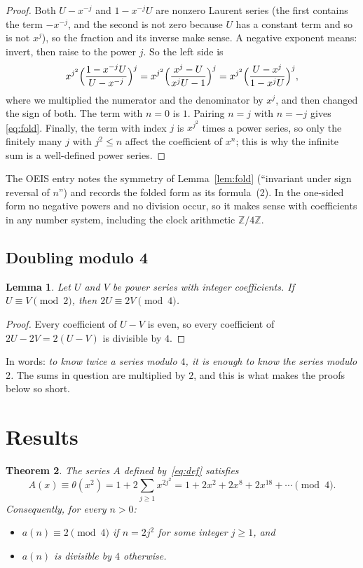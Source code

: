 \documentclass[11pt,a4paper]{article}
\newtheorem{theorem}{Theorem}[section]
\newtheorem{lemma}[theorem]{Lemma}
\theoremstyle{definition}
\theoremstyle{remark}
\newcommand{\Z}{\mathbb{Z}}
\begin{document}
\begin{proof}
Both $U-x^{-j}$ and $1-x^{-j}U$ are nonzero Laurent series (the first contains the term $-x^{-j}$, and the second is
not zero because $U$ has a constant term and so is not $x^j$), so the fraction and its inverse make sense. A negative
exponent means: invert, then raise to the power $j$. So the left side is
\[
x^{j^2}\Bigl(\frac{1-x^{-j}U}{U-x^{-j}}\Bigr)^{j}
=x^{j^2}\Bigl(\frac{x^j-U}{x^jU-1}\Bigr)^{j}
=x^{j^2}\Bigl(\frac{U-x^j}{1-x^jU}\Bigr)^{j},
\]
where we multiplied the numerator and the denominator by $x^j$, and then changed the sign of both. The term with
$n=0$ is $1$. Pairing $n=j$ with $n=-j$ gives \eqref{eq:fold}. Finally, the term with index $j$ is $x^{j^2}$ times a
power series, so only the finitely many $j$ with $j^2\le n$ affect the coefficient of $x^n$; this is why the infinite
sum is a well-defined power series.
\end{proof}

The OEIS entry notes the symmetry of Lemma~\ref{lem:fold} (``invariant under sign reversal of $n$'') and records the
folded form as its formula~(2). In the one-sided form no negative powers and no division occur, so it makes sense
with coefficients in any number system, including the clock arithmetic $\Z/4\Z$.

\subsection{Doubling modulo 4}
\begin{lemma}\label{lem:double}
Let $U$ and $V$ be power series with integer coefficients. If $U\equiv V\pmod 2$, then $2U\equiv2V\pmod 4$.
\end{lemma}

\begin{proof}
Every coefficient of $U-V$ is even, so every coefficient of $2U-2V=2(U-V)$ is divisible by $4$.
\end{proof}
In words: \emph{to know twice a series modulo $4$, it is enough to know the series modulo $2$.} The sums in
question are multiplied by $2$, and this is what makes the proofs below so short.


\section{Results}\label{sec:results}

\begin{theorem}\label{thm:main}
The series $A$ defined by~\eqref{eq:def} satisfies
\[
A(x)\equiv\theta(x^2)=1+2\sum_{j\ge1}x^{2j^2}=1+2x^2+2x^8+2x^{18}+\cdots\pmod4 .
\]
Consequently, for every $n>0$:
\begin{itemize}
\item $a(n)\equiv2\pmod 4$ if $n=2j^2$ for some integer $j\ge1$, and
\item $a(n)$ is divisible by $4$ otherwise.
\end{itemize}
\end{theorem}
\end{document}
